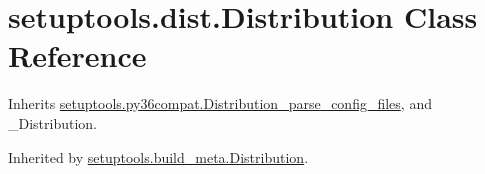 \hypertarget{classsetuptools_1_1dist_1_1_distribution}{}\section{setuptools.\+dist.\+Distribution Class Reference}
\label{classsetuptools_1_1dist_1_1_distribution}


Inherits \hyperlink{classsetuptools_1_1py36compat_1_1_distribution__parse__config__files}{setuptools.\+py36compat.\+Distribution\+\_\+parse\+\_\+config\+\_\+files}, and \+\_\+\+Distribution.



Inherited by \hyperlink{classsetuptools_1_1build__meta_1_1_distribution}{setuptools.\+build\+\_\+meta.\+Distribution}.

